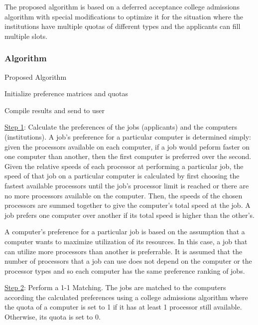 \documentclass[conference]{IEEEtran}
\begin{document}
The proposed algorithm is based on a deferred acceptance
college admissions algorithm with special modifications to optimize it for 
the situation where the institutions have multiple quotas of different
types and the applicants can fill multiple slots.
\subsubsection{Algorithm}

\begin{algorithm}
\caption{Proposed Algorithm}\label{alg:PA}

Initialize preference matrices and quotas\;


Compile results and send to user\
\end{algorithm}
\underline{Step 1}: Calculate the preferences of the jobs (applicants) and the computers
(institutions).
A job's preference for a particular computer is determined simply:
given the processors available on each computer, if a job would peform 
faster on one computer than another, then the first computer is preferred over the second. 
Given the relative speeds of each processor at performing a particular job,
the speed of that job on a particular computer is calculated by first choosing the fastest
available processors until the job's processor limit is reached or there are no more
processors available on the computer.
Then, the speeds of the chosen processors are summed together to give 
the computer's total speed at the job.
A job prefers one computer over another if its total speed
is higher than the other's. 

A computer's preference for a particular job is based on the assumption
that a computer wants to maximize utilization of its resources. 
In this case, a job that can utilize more processors than another
is preferrable. It is assumed that the number of processors that a job can use 
does not depend on the computer or the processor types and so each computer
has the same preference ranking of jobs.


\underline{Step 2}: Perform a 1-1 Matching.
The jobs are matched to the computers according the calculated preferences
using a college admissions algorithm where the quota of a computer is 
set to 1 if it has at least 1 processor still available. 
Otherwise, its quota is set to 0.
\end{document}
